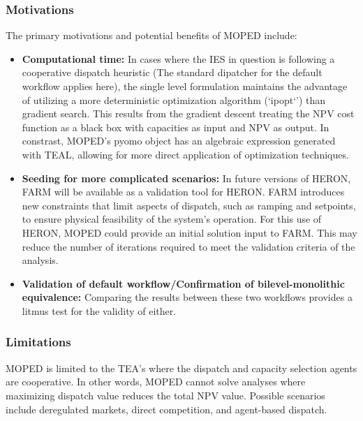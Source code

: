 \subsubsection{Motivations}
The primary motivations and potential benefits of MOPED include:
\begin{itemize}
    \item \textbf{Computational time:} In cases where the IES in question is following a cooperative dispatch heuristic (The standard dipatcher for the default workflow applies here), the single level formulation maintains the advantage of utilizing a more deterministic optimization algorithm
          (`ipopt`') than gradient search. This results from the gradient descent treating the NPV cost function as a black box with capacities as input and NPV as output. In constrast, MOPED's pyomo object has an algebraic expression generated with TEAL, allowing for more direct application of optimization techniques.
    \item \textbf{Seeding for more complicated scenarios:} In future versions of HERON, FARM will be available as a validation tool for HERON. FARM introduces new constraints that limit aspects of dispatch, such as ramping and setpoints, to ensure physical feasibility of the system's operation.
          For this use of HERON, MOPED could provide an initial solution input to FARM. This may reduce the number of iterations required to meet the validation criteria of the analysis.
    \item \textbf{Validation of default workflow/Confirmation of bilevel-monolithic equivalence:} Comparing the results between these two workflows provides a litmus test for the validity of either.
\end{itemize}

\subsubsection{Limitations}
MOPED is limited to the TEA's where the dispatch and capacity selection agents are cooperative. In other words, MOPED cannot solve analyses where maximizing dispatch value reduces the total NPV value. Possible scenarios include deregulated markets, direct competition, and agent-based dispatch.


